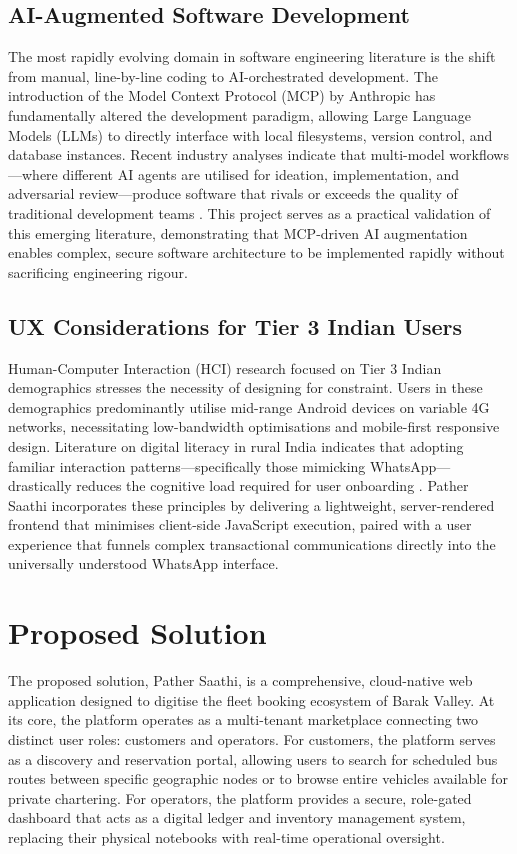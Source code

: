 \documentclass[12pt,a4paper]{report}
\begin{document}
\section{AI-Augmented Software Development}
The most rapidly evolving domain in software engineering literature is the shift from manual, line-by-line coding to AI-orchestrated development. The introduction of the Model Context Protocol (MCP) by Anthropic has fundamentally altered the development paradigm, allowing Large Language Models (LLMs) to directly interface with local filesystems, version control, and database instances. Recent industry analyses indicate that multi-model workflows---where different AI agents are utilised for ideation, implementation, and adversarial review---produce software that rivals or exceeds the quality of traditional development teams \cite{indicative3}. This project serves as a practical validation of this emerging literature, demonstrating that MCP-driven AI augmentation enables complex, secure software architecture to be implemented rapidly without sacrificing engineering rigour.

\section{UX Considerations for Tier 3 Indian Users}
Human-Computer Interaction (HCI) research focused on Tier 3 Indian demographics stresses the necessity of designing for constraint. Users in these demographics predominantly utilise mid-range Android devices on variable 4G networks, necessitating low-bandwidth optimisations and mobile-first responsive design. Literature on digital literacy in rural India indicates that adopting familiar interaction patterns---specifically those mimicking WhatsApp---drastically reduces the cognitive load required for user onboarding \cite{indicative4}. Pather Saathi incorporates these principles by delivering a lightweight, server-rendered frontend that minimises client-side JavaScript execution, paired with a user experience that funnels complex transactional communications directly into the universally understood WhatsApp interface.

\chapter{Proposed Solution}

The proposed solution, Pather Saathi, is a comprehensive, cloud-native web application designed to digitise the fleet booking ecosystem of Barak Valley. At its core, the platform operates as a multi-tenant marketplace connecting two distinct user roles: customers and operators. For customers, the platform serves as a discovery and reservation portal, allowing users to search for scheduled bus routes between specific geographic nodes or to browse entire vehicles available for private chartering. For operators, the platform provides a secure, role-gated dashboard that acts as a digital ledger and inventory management system, replacing their physical notebooks with real-time operational oversight. 
\end{document}
